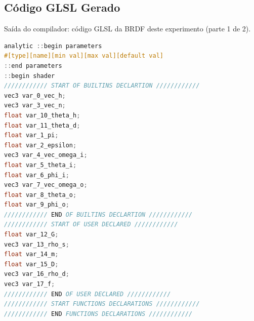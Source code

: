 \subsection{Código GLSL Gerado}
\begin{codigo}[H]
    \caption{\small Saída do compilador: código GLSL da BRDF deste experimento (parte 1 de 2).}
    \label{cod-cook-torrance-glsl-pt-1}
\begin{lstlisting}[language=C, inputencoding=utf8]
analytic ::begin parameters
#[type][name][min val][max val][default val]
::end parameters
::begin shader
//////////// START OF BUILTINS DECLARTION ////////////
vec3 var_0_vec_h;
vec3 var_3_vec_n;
float var_10_theta_h;
float var_11_theta_d;
float var_1_pi;
float var_2_epsilon;
vec3 var_4_vec_omega_i;
float var_5_theta_i;
float var_6_phi_i;
vec3 var_7_vec_omega_o;
float var_8_theta_o;
float var_9_phi_o;
//////////// END OF BUILTINS DECLARTION ////////////
//////////// START OF USER DECLARED ////////////
float var_12_G;
vec3 var_13_rho_s;
float var_14_m;
float var_15_D;
vec3 var_16_rho_d;
vec3 var_17_f;
//////////// END OF USER DECLARED ////////////
//////////// START FUNCTIONS DECLARATIONS ////////////
//////////// END FUNCTIONS DECLARATIONS ////////////
\end{lstlisting}
\end{codigo}

